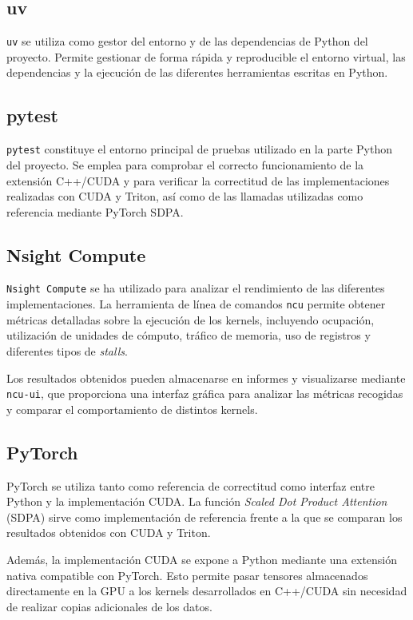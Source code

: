 \subsection{uv}

\texttt{uv} se utiliza como gestor del entorno y de las dependencias de Python del proyecto. Permite gestionar de forma rápida y reproducible el entorno virtual, las dependencias y la ejecución de las diferentes herramientas escritas en Python.

\subsection{pytest}

\texttt{pytest} constituye el entorno principal de pruebas utilizado en la parte Python del proyecto. Se emplea para comprobar el correcto funcionamiento de la extensión C++/CUDA y para verificar la correctitud de las implementaciones realizadas con CUDA y Triton, así como de las llamadas utilizadas como referencia mediante PyTorch SDPA.

\subsection{Nsight Compute}

\texttt{Nsight Compute} se ha utilizado para analizar el rendimiento de las diferentes implementaciones. La herramienta de línea de comandos \texttt{ncu} permite obtener métricas detalladas sobre la ejecución de los kernels, incluyendo ocupación, utilización de unidades de cómputo, tráfico de memoria, uso de registros y diferentes tipos de \textit{stalls}.

Los resultados obtenidos pueden almacenarse en informes y visualizarse mediante \texttt{ncu-ui}, que proporciona una interfaz gráfica para analizar las métricas recogidas y comparar el comportamiento de distintos kernels.

\subsection{PyTorch}

PyTorch se utiliza tanto como referencia de correctitud como interfaz entre Python y la implementación CUDA. La función \textit{Scaled Dot Product Attention} (SDPA) sirve como implementación de referencia frente a la que se comparan los resultados obtenidos con CUDA y Triton.

Además, la implementación CUDA se expone a Python mediante una extensión nativa compatible con PyTorch. Esto permite pasar tensores almacenados directamente en la GPU a los kernels desarrollados en C++/CUDA sin necesidad de realizar copias adicionales de los datos.

